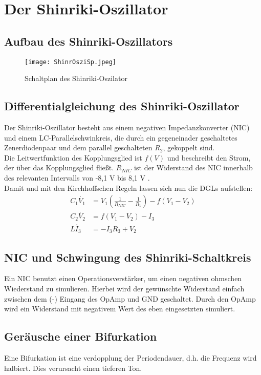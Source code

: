 

\section{Der Shinriki-Oszillator}
\label{sec:shinrikiOszi}

\subsection{Aufbau des Shinriki-Oszillators}
\label{sub:aufbauShinriki}

\begin{figure}[h]
    \centering
    \texttt{[image: ShinrOsziSp.jpeg]}
    \label{fig:shinrikiSp}
    \caption{Schaltplan des Shinriki-Oszilator}
\end{figure}

\subsection{Differentialgleichung des Shinriki-Oszillator}
\label{sub:dgl}

Der Shinriki-Oszillator besteht aus einem negativen Impedanzkonverter (NIC) und einem LC-Parallelschwinkreis, die durch ein gegeneinader geschaltetes Zenerdiodenpaar und dem parallel geschalteten \(R_2\), gekoppelt sind. \\
Die Leitwertfunktion des Kopplungsglied ist \( f(V)\) und beschreibt den Strom, der über das Kopplungsglied fließt.
\(R_{NIC}\) ist der Widerstand des NIC innerhalb des relevanten Intervalls von -8,1 V bis 8,1 V \citep[]{Lueck}.\\
Damit und mit den Kirchhoffschen Regeln lassen sich nun die DGLs aufstellen:
\begin{align}
    C_1 \dot{V_1} &= V_1 (\frac{1}{R_{NIC}}-\frac{1}{R_1}) - f(V_1-V_2) \\
    C_2 \dot{V_2} &= f(V_1-V_2) - I_3 \\
    L \dot{I_3} &= -I_3R_3 + V_2
\end{align}

\subsection{NIC und Schwingung des Shinriki-Schaltkreis}
\label{sub:nic}
Ein NIC benutzt einen Operationsverstärker, um einen negativen ohmschen Wiederstand zu simulieren. Hierbei wird der gewünschte Widerstand einfach zwischen dem (-) Eingang des OpAmp und GND geschaltet. Durch den OpAmp wird ein Widerstand mit negativem Wert des eben eingesetzten simuliert.

\subsection{Geräusche einer Bifurkation}
\label{sub:tonBifurkation}
Eine Bifurkation ist eine verdopplung der Periodendauer, d.h. die Frequenz wird halbiert. Dies verursacht einen tieferen Ton.

